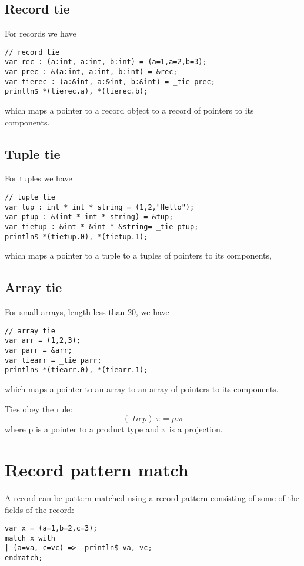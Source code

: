 \documentclass{article}
\begin{document}
\subsection{Record tie}
For records we have

\begin{verbatim}
// record tie
var rec : (a:int, a:int, b:int) = (a=1,a=2,b=3);
var prec : &(a:int, a:int, b:int) = &rec;
var tierec : (a:&int, a:&int, b:&int) = _tie prec;
println$ *(tierec.a), *(tierec.b);
\end{verbatim}

which maps a pointer to a record object to a record of pointers to its
components. 

\subsection{Tuple tie}
For tuples we have

\begin{verbatim}
// tuple tie
var tup : int * int * string = (1,2,"Hello");
var ptup : &(int * int * string) = &tup;
var tietup : &int * &int * &string= _tie ptup;
println$ *(tietup.0), *(tietup.1);
\end{verbatim}

which maps a pointer to a tuple to a tuples of pointers to its
components, 

\subsection{Array tie}
For small arrays, length less than 20, we have

\begin{verbatim}
// array tie
var arr = (1,2,3);
var parr = &arr;
var tiearr = _tie parr;
println$ *(tiearr.0), *(tiearr.1);
\end{verbatim}

which maps a pointer to an array to an array of pointers to its components.

Ties obey the rule:
$$ ({\mathrm \_tie} p) . \pi = p . \pi$$
where p is a pointer to a product type and $\pi$ is a projection.

\section{Record pattern match}
A record can be pattern matched using a record pattern
consisting of some of the fields of the record:

\begin{verbatim}
var x = (a=1,b=2,c=3);
match x with
| (a=va, c=vc) =>  println$ va, vc;
endmatch;
\end{verbatim}
\end{document}
